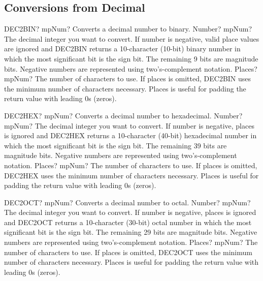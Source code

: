 \subsection{Conversions from Decimal}


\begin{mpFunctionsExtract}
	\mpWorksheetFunctionTwoNotImplemented
	{DEC2BIN? mpNum? Converts a decimal number to binary.}
	{Number? mpNum? The decimal integer you want to convert. If number is negative, valid place values are ignored and DEC2BIN returns a 10-character (10-bit) binary number in which the most significant bit is the sign bit. The remaining 9 bits are magnitude bits. Negative numbers are represented using two's-complement notation.}
	{Places? mpNum? The number of characters to use. If places is omitted, DEC2BIN uses the minimum number of characters necessary. Places is useful for padding the return value with leading 0s (zeros).}
\end{mpFunctionsExtract}


\vspace{0.6cm}
\begin{mpFunctionsExtract}
	\mpWorksheetFunctionTwoNotImplemented
	{DEC2HEX? mpNum? Converts a decimal number to hexadecimal.}
	{Number? mpNum? The decimal integer you want to convert. If number is negative, places is ignored and DEC2HEX returns a 10-character (40-bit) hexadecimal number in which the most significant bit is the sign bit. The remaining 39 bits are magnitude bits. Negative numbers are represented using two's-complement notation.}
	{Places? mpNum? The number of characters to use. If places is omitted, DEC2HEX uses the minimum number of characters necessary. Places is useful for padding the return value with leading 0s (zeros).}
\end{mpFunctionsExtract}


\vspace{0.6cm}
\begin{mpFunctionsExtract}
	\mpWorksheetFunctionTwoNotImplemented
	{DEC2OCT? mpNum? Converts a decimal number to octal.}
	{Number? mpNum? The decimal integer you want to convert. If number is negative, places is ignored and DEC2OCT returns a 10-character (30-bit) octal number in which the most significant bit is the sign bit. The remaining 29 bits are magnitude bits. Negative numbers are represented using two's-complement notation.}
	{Places? mpNum? The number of characters to use. If places is omitted, DEC2OCT uses the minimum number of characters necessary. Places is useful for padding the return value with leading 0s (zeros).}
\end{mpFunctionsExtract}




